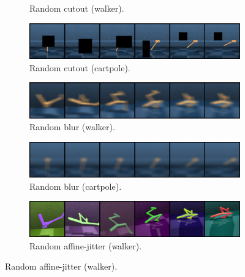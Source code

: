 \begin{figure}[H]
\begin{subfigure}[b]{0.48\textwidth}
        \caption{Random cutout (walker).}
        \vspace{0.1in}
    \end{subfigure}
    \begin{subfigure}[b]{0.48\textwidth}
        \centering
        \includegraphics[width=\textwidth]{figures/visualizations/grid_cartpole_cutout.png}
        \caption{Random cutout (cartpole).}
        \vspace{0.1in}
    \end{subfigure}
    \begin{subfigure}[b]{0.48\textwidth}
        \centering
        \includegraphics[width=\textwidth]{figures/visualizations/grid_blur.png}
        \caption{Random blur (walker).}
        \vspace{0.1in}
    \end{subfigure}
    \begin{subfigure}[b]{0.48\textwidth}
        \centering
        \includegraphics[width=\textwidth]{figures/visualizations/grid_cartpole_blur.png}
        \caption{Random blur (cartpole).}
        \vspace{0.1in}
    \end{subfigure}
    \begin{subfigure}[b]{0.48\textwidth}
        \centering
        \includegraphics[width=\textwidth]{figures/visualizations/grid_affinejitter.png}
        \caption{Random affine-jitter (walker).}
        \vspace{0.1in}

\end{subfigure}
\end{figure}
